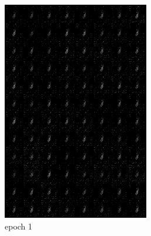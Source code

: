 \documentclass[a4paper]{article}
\theoremstyle{definition}
\begin{document}
\begin{enumerate} [label=(\alph*)]
		\begin{figure}[H]
			\centering
			\begin{subfigure}[b]{0.28\textwidth}
				\centering
				\includegraphics[width=\textwidth]{gen_img1.png}
				\caption{epoch 1}
			\end{subfigure}
			\hfill
			\begin{subfigure}[b]{0.28\textwidth}
				\centering

\end{subfigure}
\end{figure}
\end{enumerate}
\end{document}
